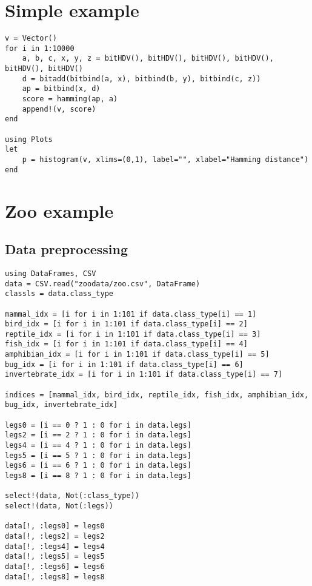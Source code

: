 \section{Simple example}
\begin{verbatim}
v = Vector()
for i in 1:10000
    a, b, c, x, y, z = bitHDV(), bitHDV(), bitHDV(), bitHDV(), bitHDV(), bitHDV()
    d = bitadd(bitbind(a, x), bitbind(b, y), bitbind(c, z))
    ap = bitbind(x, d)
    score = hamming(ap, a)
    append!(v, score)
end

using Plots
let
	p = histogram(v, xlims=(0,1), label="", xlabel="Hamming distance")
end
\end{verbatim}
\section{Zoo example}
\subsection{Data preprocessing}
\begin{verbatim}
using DataFrames, CSV
data = CSV.read("zoodata/zoo.csv", DataFrame)
classls = data.class_type

mammal_idx = [i for i in 1:101 if data.class_type[i] == 1]
bird_idx = [i for i in 1:101 if data.class_type[i] == 2]
reptile_idx = [i for i in 1:101 if data.class_type[i] == 3]
fish_idx = [i for i in 1:101 if data.class_type[i] == 4]
amphibian_idx = [i for i in 1:101 if data.class_type[i] == 5]
bug_idx = [i for i in 1:101 if data.class_type[i] == 6]
invertebrate_idx = [i for i in 1:101 if data.class_type[i] == 7]

indices = [mammal_idx, bird_idx, reptile_idx, fish_idx, amphibian_idx, bug_idx, invertebrate_idx]

legs0 = [i == 0 ? 1 : 0 for i in data.legs]
legs2 = [i == 2 ? 1 : 0 for i in data.legs]
legs4 = [i == 4 ? 1 : 0 for i in data.legs]
legs5 = [i == 5 ? 1 : 0 for i in data.legs]
legs6 = [i == 6 ? 1 : 0 for i in data.legs]
legs8 = [i == 8 ? 1 : 0 for i in data.legs]

select!(data, Not(:class_type))
select!(data, Not(:legs))

data[!, :legs0] = legs0
data[!, :legs2] = legs2
data[!, :legs4] = legs4
data[!, :legs5] = legs5
data[!, :legs6] = legs6
data[!, :legs8] = legs8
\end{verbatim}
